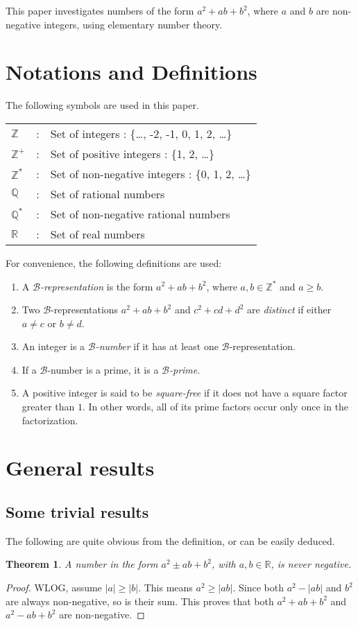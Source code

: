 \documentclass[reqno]{amsart}
\newtheorem{theorem}{Theorem}
\newcommand{\bnum}   {\ensuremath{\mathcal B}-number}
\newcommand{\bprime} {\ensuremath{\mathcal B}-prime}
\newcommand{\brep}   {\ensuremath{\mathcal B}-representation}
\newcommand{\bq}[2]{\ensuremath{{#1}^2 + {#1}{#2} + {#2}^2}}
\newcommand{\bqab}{\bq{a}{b}}
\newcommand{\bqcd}{\bq{c}{d}}
\newcommand{\Integer}{\ensuremath{\mathbb{Z}}}
\newcommand{\Positive}{\ensuremath{\mathbb{Z^+}}}
\newcommand{\Nonnegative}{\ensuremath{\mathbb{Z^*}}}
\newcommand{\Rational}{\ensuremath{\mathbb{Q}}}
\newcommand{\NonnegativeRational}{\ensuremath{\mathbb{Q^*}}}
\newcommand{\Real}{\ensuremath{\mathbb{R}}}
\begin{document}
This paper investigates numbers of the form \bqab,
where $a$ and $b$ are non-negative integers, using
elementary number theory. 

\section{Notations and Definitions}
\label{sec:Notations}
The following symbols are used in this paper.

\vspace{10pt}
\begin{tabular}{lcl}
  \Integer &:& Set of integers :  \{\ldots, -2, -1, 0,
  1, 2, \ldots\} \\
  \Positive &:& Set of positive integers : \{1, 2,
  \ldots\} \\
  \Nonnegative &:& Set of non-negative integers : 
  \{0, 1, 2, \ldots\} \\
  \Rational &:& Set of rational numbers \\
  \NonnegativeRational &:& Set of non-negative rational numbers \\
  \Real &:& Set of real numbers
\end{tabular}
\vspace{10pt}

For convenience, the following definitions are used:
\begin{enumerate}
\item A {\em \brep} is the form \bqab{}, where $a,b \in
  \Nonnegative$ and $a \ge b$.  
\item Two \brep{}s \bqab{} and \bqcd{} are {\em
    distinct} if either $a \ne c$ or $b \ne d$.
\item An integer is a {\em \bnum{}} if it has at least one \brep.
\item If a \bnum{} is a prime, it is a {\em \bprime}.
\item A positive integer is said to be {\em square-free} if
  it does not have a square factor greater than $1$.  In
  other words, all of its prime factors occur only once in the
  factorization.
\end{enumerate}

\section{General results}
\subsection{Some trivial results}
The following are quite obvious from the definition, or can
be easily deduced.
\begin{theorem}
  \label{th:BqNotNegative}
  A number in the form $a^2 \pm ab + b^2$, with $a,b \in \Real$,
  is never negative.
\end{theorem}
\begin{proof}
  WLOG, assume $|a| \ge |b|$.  This means $a^2 \ge |ab|$.
  Since both $a^2 - |ab|$ and $b^2$ are always non-negative,
  so is their sum.   This proves that both \bqab{} and
  $a^2-ab+b^2$ are non-negative.
\end{proof}
\end{document}
